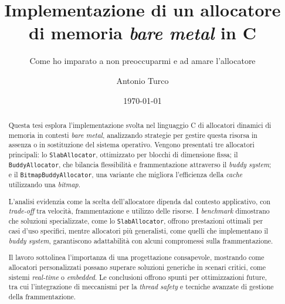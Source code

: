 \documentclass[noexaminfo,oneside]{sapthesis}
\title{Implementazione di un allocatore di memoria \textit{bare metal} in C}
\subtitle{Come ho imparato a non preoccuparmi e ad amare l'allocatore}
\author{Antonio Turco}
\date{\today}
\begin{document}
\frontmatter  
\maketitle
\dedication{A chi fa della curiosità il proprio mestiere}

\begin{abstract}
Questa tesi esplora l’implementazione svolta nel linguaggio C di allocatori dinamici di memoria in contesti \textit{bare metal}, analizzando strategie per gestire questa risorsa in assenza o in sostituzione del sistema operativo. Vengono presentati tre allocatori principali: lo \texttt{SlabAllocator}, ottimizzato per blocchi di dimensione fissa; il \texttt{BuddyAllocator}, che bilancia flessibilità e frammentazione attraverso il \textit{buddy system}; e il \texttt{BitmapBuddyAllocator}, una variante che migliora l’efficienza della \textit{cache} utilizzando una \textit{bitmap}.

L’analisi evidenzia come la scelta dell’allocatore dipenda dal contesto applicativo, con \textit{trade-off} tra velocità, frammentazione e utilizzo delle risorse. I \textit{benchmark} dimostrano che soluzioni specializzate, come lo \texttt{SlabAllocator}, offrono prestazioni ottimali per casi d’uso specifici, mentre allocatori più generalisti, come quelli che implementano il \textit{buddy system}, garantiscono adattabilità con alcuni compromessi sulla frammentazione.

Il lavoro sottolinea l’importanza di una progettazione consapevole, mostrando come allocatori personalizzati possano superare soluzioni generiche in scenari critici, come sistemi \textit{real-time} o \textit{embedded}. Le conclusioni offrono spunti per ottimizzazioni future, tra cui l’integrazione di meccanismi per la \textit{thread safety} e tecniche avanzate di gestione della frammentazione.
\end{abstract}


\mainmatter 
\tableofcontents













\backmatter
\end{document}
